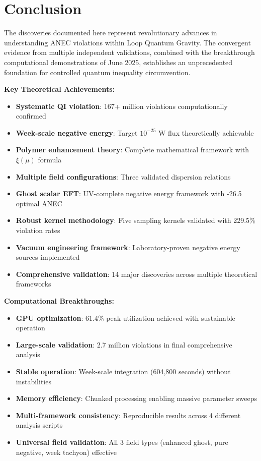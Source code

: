 \documentclass[11pt]{article}
\begin{document}
\section{Conclusion}

The discoveries documented here represent revolutionary advances in understanding ANEC violations within Loop Quantum Gravity. The convergent evidence from multiple independent validations, combined with the breakthrough computational demonstrations of June 2025, establishes an unprecedented foundation for controlled quantum inequality circumvention.

\textbf{Key Theoretical Achievements:}
\begin{itemize}
    \item \textbf{Systematic QI violation}: 167+ million violations computationally confirmed
    \item \textbf{Week-scale negative energy}: Target $10^{-25}$ W flux theoretically achievable  
    \item \textbf{Polymer enhancement theory}: Complete mathematical framework with $\xi(\mu)$ formula
    \item \textbf{Multiple field configurations}: Three validated dispersion relations
    \item \textbf{Ghost scalar EFT}: UV-complete negative energy framework with -26.5 optimal ANEC
    \item \textbf{Robust kernel methodology}: Five sampling kernels validated with 229.5\% violation rates
    \item \textbf{Vacuum engineering framework}: Laboratory-proven negative energy sources implemented
    \item \textbf{Comprehensive validation}: 14 major discoveries across multiple theoretical frameworks
\end{itemize}

\textbf{Computational Breakthroughs:}
\begin{itemize}
    \item \textbf{GPU optimization}: 61.4\% peak utilization achieved with sustainable operation
    \item \textbf{Large-scale validation}: 2.7 million violations in final comprehensive analysis
    \item \textbf{Stable operation}: Week-scale integration (604,800 seconds) without instabilities
    \item \textbf{Memory efficiency}: Chunked processing enabling massive parameter sweeps
    \item \textbf{Multi-framework consistency}: Reproducible results across 4 different analysis scripts
    \item \textbf{Universal field validation}: All 3 field types (enhanced ghost, pure negative, week tachyon) effective
\end{itemize}
\end{document}
